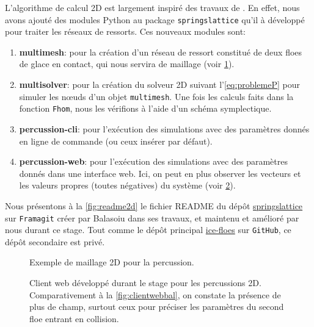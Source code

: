 L'algorithme de calcul 2D est largement inspiré des travaux de \citeauthor{balasoiu2020halthesis}. En effet, nous avons ajouté des modules Python au package \texttt{springslattice} qu'il à développé pour traiter les réseaux de ressorts. Ces nouveaux modules sont:
\begin{enumerate}
    \item \textbf{multimesh}: pour la création d'un réseau de ressort constitué de deux floes de glace en contact, qui nous servira de maillage (voir \cref{fig:percussion2d}).
    \item \textbf{multisolver}: pour la création du solveur 2D suivant l'\cref{eq:problemeP} pour simuler les n\oe{}uds d'un objet \texttt{multimesh}. Une fois les calculs faits dans la fonction \texttt{Fhom}, nous les vérifions à l'aide d'un schéma symplectique.
    \item \textbf{percussion-cli}: pour l'exécution des simulations avec des paramètres donnés en ligne de commande (ou ceux insérer par défaut).
    \item \textbf{percussion-web}: pour l'exécution des simulations avec des paramètres donnés dans une interface web. Ici, on peut en plus observer les vecteurs et les valeurs propres (toutes négatives) du système (voir \cref{fig:clientwebmoi}).
\end{enumerate}


Nous présentons à la \cref{fig:readme2d} le fichier README du dépôt \href{https://framagit.org/RaK/SimuRessorts}{springslattice} sur \texttt{Framagit} créer par Balasoiu dans ses travaux, et maintenu et amélioré par nous durant ce stage. Tout comme le dépôt principal \href{https://github.com/desmond-rn/ice-floes}{ice-floes} sur \texttt{GitHub}, ce dépôt secondaire est privé.



\begin{figure}[H]
    \centering
    \caption{Exemple de maillage 2D pour la percussion.}
    \label{fig:percussion2d}
\end{figure}


\begin{figure}[H]
    \centering
    \caption{Client web développé durant le stage pour les percussions 2D. Comparativement à la \cref{fig:clientwebbal}, on constate la présence de plus de champ, surtout ceux pour préciser les paramètres du second floe entrant en collision.}
    \label{fig:clientwebmoi}
\end{figure}



